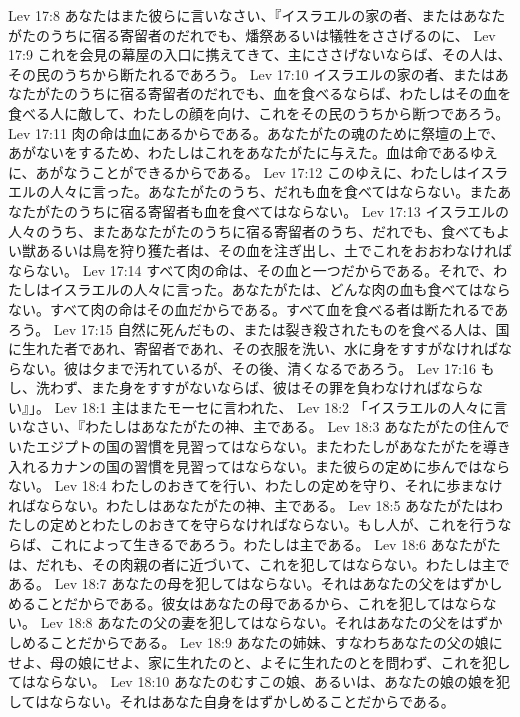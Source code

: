 Lev 17:8  あなたはまた彼らに言いなさい、『イスラエルの家の者、またはあなたがたのうちに宿る寄留者のだれでも、燔祭あるいは犠牲をささげるのに、
Lev 17:9  これを会見の幕屋の入口に携えてきて、主にささげないならば、その人は、その民のうちから断たれるであろう。
Lev 17:10  イスラエルの家の者、またはあなたがたのうちに宿る寄留者のだれでも、血を食べるならば、わたしはその血を食べる人に敵して、わたしの顔を向け、これをその民のうちから断つであろう。
Lev 17:11  肉の命は血にあるからである。あなたがたの魂のために祭壇の上で、あがないをするため、わたしはこれをあなたがたに与えた。血は命であるゆえに、あがなうことができるからである。
Lev 17:12  このゆえに、わたしはイスラエルの人々に言った。あなたがたのうち、だれも血を食べてはならない。またあなたがたのうちに宿る寄留者も血を食べてはならない。
Lev 17:13  イスラエルの人々のうち、またあなたがたのうちに宿る寄留者のうち、だれでも、食べてもよい獣あるいは鳥を狩り獲た者は、その血を注ぎ出し、土でこれをおおわなければならない。
Lev 17:14  すべて肉の命は、その血と一つだからである。それで、わたしはイスラエルの人々に言った。あなたがたは、どんな肉の血も食べてはならない。すべて肉の命はその血だからである。すべて血を食べる者は断たれるであろう。
Lev 17:15  自然に死んだもの、または裂き殺されたものを食べる人は、国に生れた者であれ、寄留者であれ、その衣服を洗い、水に身をすすがなければならない。彼は夕まで汚れているが、その後、清くなるであろう。
Lev 17:16  もし、洗わず、また身をすすがないならば、彼はその罪を負わなければならない』」。
Lev 18:1  主はまたモーセに言われた、
Lev 18:2  「イスラエルの人々に言いなさい、『わたしはあなたがたの神、主である。
Lev 18:3  あなたがたの住んでいたエジプトの国の習慣を見習ってはならない。またわたしがあなたがたを導き入れるカナンの国の習慣を見習ってはならない。また彼らの定めに歩んではならない。
Lev 18:4  わたしのおきてを行い、わたしの定めを守り、それに歩まなければならない。わたしはあなたがたの神、主である。
Lev 18:5  あなたがたはわたしの定めとわたしのおきてを守らなければならない。もし人が、これを行うならば、これによって生きるであろう。わたしは主である。
Lev 18:6  あなたがたは、だれも、その肉親の者に近づいて、これを犯してはならない。わたしは主である。
Lev 18:7  あなたの母を犯してはならない。それはあなたの父をはずかしめることだからである。彼女はあなたの母であるから、これを犯してはならない。
Lev 18:8  あなたの父の妻を犯してはならない。それはあなたの父をはずかしめることだからである。
Lev 18:9  あなたの姉妹、すなわちあなたの父の娘にせよ、母の娘にせよ、家に生れたのと、よそに生れたのとを問わず、これを犯してはならない。
Lev 18:10  あなたのむすこの娘、あるいは、あなたの娘の娘を犯してはならない。それはあなた自身をはずかしめることだからである。

